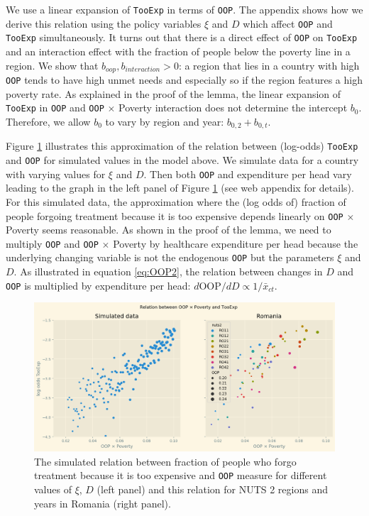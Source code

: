 \documentclass[a4paper,12pt]{article}
\begin{document}
We use a linear expansion of \texttt{TooExp} in terms of \texttt{OOP}. The appendix shows how we derive this relation using the policy variables \(\xi\) and \(D\) which affect \texttt{OOP} and \texttt{TooExp} simultaneously. It turns out that there is a direct effect of \texttt{OOP} on \texttt{TooExp} and an interaction effect with the fraction of people below the poverty line in a region. We show that \(b_{oop},b_{interaction} > 0\): a region that lies in a country with high \texttt{OOP} tends to have high unmet needs and especially so if the region features a high poverty rate. As explained in the proof of the lemma, the linear expansion of \texttt{TooExp} in \texttt{OOP} and \texttt{OOP} \(\times\) Poverty interaction does not determine the intercept \(b_{0}\). Therefore, we allow \(b_0\) to vary by region and year: \(b_{0,2} + b_{0,t}\). 

Figure \ref{fig:Parametric} illustrates this approximation of the relation between (log-odds) \texttt{TooExp} and \texttt{OOP} for simulated values in the model above. We simulate data for a country with varying values for \(\xi\) and \(D\). Then both \texttt{OOP} and expenditure per head vary leading to the graph in the left panel of Figure \ref{fig:Parametric} (see web appendix for details). For this simulated data, the approximation where the (log odds of) fraction of people forgoing treatment because it is too expensive depends linearly on \texttt{OOP} \(\times\) Poverty seems reasonable. As shown in the proof of the lemma, we need to multiply \texttt{OOP} and \texttt{OOP} \(\times\) Poverty by healthcare expenditure per head because the underlying changing variable is not the endogenous \texttt{OOP} but the parameters \(\xi\) and \(D\). As illustrated in equation \eqref{eq:OOP2}, the relation between changes in \(D\) and \texttt{OOP} is multiplied by expenditure per head: \(d \text{OOP}/d D \propto 1/\bar{x}_{ct}\).

\begin{figure}[htbp]
\centering
\includegraphics[width=.9\linewidth]{./figures/Parametric3.png}
\caption{\label{fig:Parametric}The simulated relation between fraction of people who forgo treatment because it is too expensive and \texttt{OOP} measure for different values of \(\xi\), \(D\) (left panel) and this relation for NUTS 2 regions and years in Romania (right panel).}
\end{figure}
\end{document}

